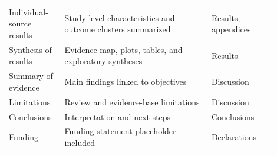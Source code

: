 \begin{longtable}{@{}p{0.18\linewidth}p{0.50\linewidth}p{0.22\linewidth}@{}}
Individual-source results & Study-level characteristics and outcome clusters summarized & Results; appendices \\
Synthesis of results & Evidence map, plots, tables, and exploratory syntheses & Results \\
Summary of evidence & Main findings linked to objectives & Discussion \\
Limitations & Review and evidence-base limitations & Discussion \\
Conclusions & Interpretation and next steps & Conclusions \\
Funding & Funding statement placeholder included & Declarations \\
\end{longtable}
